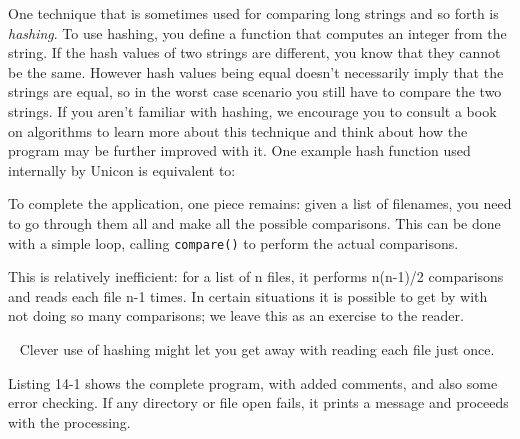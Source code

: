 One technique that is sometimes used for comparing long strings and so
forth is \textit{hashing}. To use hashing, you define a
function that computes an integer from the string. If the hash values
of two strings are different, you know that they cannot be the same.
However hash values being equal doesn't necessarily
imply that the strings are equal, so in the worst case scenario you
still have to compare the two strings. If you aren't
familiar with hashing, we encourage you to consult a book on algorithms
to learn more about this technique and think about how the program may
be further improved with it. One example hash function used internally
by Unicon is equivalent to:


To complete the application, one piece remains: given a list of
filenames, you need to go through them all and make all the possible
comparisons. This can be done with a simple loop, calling
\texttt{compare()} to perform the actual comparisons.


This is relatively inefficient: for a list of n files, it performs
n(n-1)/2 comparisons and reads each file n-1 times. In certain
situations it is possible to get by with not doing so many comparisons;
we leave this as an exercise to the reader.

\medskip{}\
{\sffamily
Clever use of hashing might let you get away with reading each
file just once.}\medskip

Listing 14-1 shows the complete program, with added comments, and also
some error checking. If any directory or file open fails, it prints a
message and proceeds with the processing.

